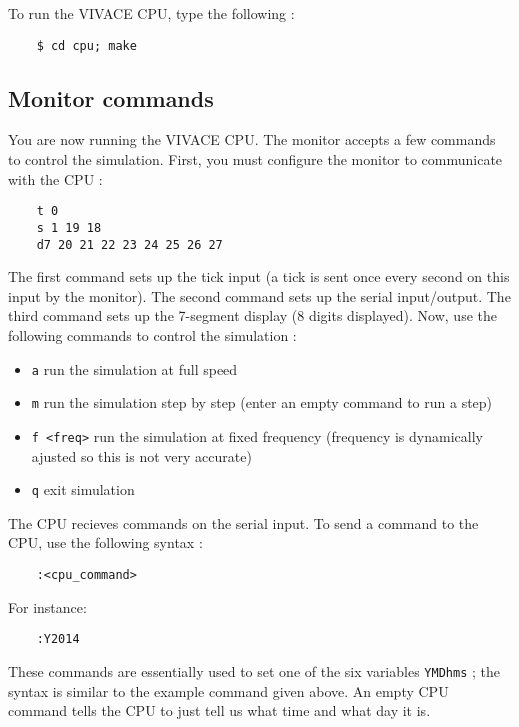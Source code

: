 \documentclass[11pt, a4paper]{article}
\newcommand{\prog}[1]{{\tt#1}}
\begin{document}
To run the VIVACE CPU, type the following :

\begin{verbatim}
    $ cd cpu; make
\end{verbatim}

\subsection{Monitor commands}

You are now running the VIVACE CPU. The monitor accepts a few commands to control the simulation.
First, you must configure the monitor to communicate with the CPU :

\begin{verbatim}
    t 0
    s 1 19 18
    d7 20 21 22 23 24 25 26 27
\end{verbatim}

The first command sets up the tick input (a tick is sent once every second on this input by the monitor). The
second command sets up the serial input/output. The third command sets up the 7-segment display (8 digits displayed).
Now, use the following commands to control the simulation :

\begin{itemize}
    \item \prog{a} run the simulation at full speed
    \item \prog{m} run the simulation step by step (enter an empty command to run a step)
    \item \prog{f <freq>} run the simulation at fixed frequency (frequency is dynamically ajusted so
            this is not very accurate)
    \item \prog{q} exit simulation
\end{itemize}

The CPU recieves commands on the serial input. To send a command to the CPU, use the following syntax :

\begin{verbatim}
    :<cpu_command>
\end{verbatim}

For instance:

\begin{verbatim}
    :Y2014
\end{verbatim}

These commands are essentially used to set one of the six variables \prog{YMDhms} ; the syntax is similar to the
example command given above. An empty CPU command tells the CPU to just tell us what time and what day it is.
\end{document}
